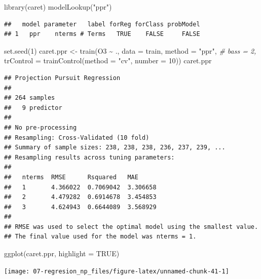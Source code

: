 \documentclass[
  spanish,
]{book}
\newenvironment{Shaded}{\begin{snugshade}}{\end{snugshade}}
\newcommand{\AttributeTok}[1]{\textcolor[rgb]{0.77,0.63,0.00}{#1}}
\newcommand{\CommentTok}[1]{\textcolor[rgb]{0.56,0.35,0.01}{\textit{#1}}}
\newcommand{\ConstantTok}[1]{\textcolor[rgb]{0.00,0.00,0.00}{#1}}
\newcommand{\DecValTok}[1]{\textcolor[rgb]{0.00,0.00,0.81}{#1}}
\newcommand{\FunctionTok}[1]{\textcolor[rgb]{0.00,0.00,0.00}{#1}}
\newcommand{\NormalTok}[1]{#1}
\newcommand{\OtherTok}[1]{\textcolor[rgb]{0.56,0.35,0.01}{#1}}
\newcommand{\SpecialCharTok}[1]{\textcolor[rgb]{0.00,0.00,0.00}{#1}}
\newcommand{\StringTok}[1]{\textcolor[rgb]{0.31,0.60,0.02}{#1}}
\theoremstyle{break}
\theoremstyle{definition}
\theoremstyle{definition}
\theoremstyle{definition}
\theoremstyle{definition}
\theoremstyle{remark}
\begin{document}
\begin{Shaded}
\begin{Highlighting}[]
\FunctionTok{library}\NormalTok{(caret)}
\FunctionTok{modelLookup}\NormalTok{(}\StringTok{"ppr"}\NormalTok{)}
\end{Highlighting}
\end{Shaded}

\begin{verbatim}
##   model parameter   label forReg forClass probModel
## 1   ppr    nterms # Terms   TRUE    FALSE     FALSE
\end{verbatim}

\begin{Shaded}
\begin{Highlighting}[]
\FunctionTok{set.seed}\NormalTok{(}\DecValTok{1}\NormalTok{)}
\NormalTok{caret.ppr }\OtherTok{\textless{}{-}} \FunctionTok{train}\NormalTok{(O3 }\SpecialCharTok{\textasciitilde{}}\NormalTok{ ., }\AttributeTok{data =}\NormalTok{ train, }\AttributeTok{method =} \StringTok{"ppr"}\NormalTok{, }\CommentTok{\# bass = 2,}
    \AttributeTok{trControl =} \FunctionTok{trainControl}\NormalTok{(}\AttributeTok{method =} \StringTok{"cv"}\NormalTok{, }\AttributeTok{number =} \DecValTok{10}\NormalTok{))}
\NormalTok{caret.ppr}
\end{Highlighting}
\end{Shaded}

\begin{verbatim}
## Projection Pursuit Regression 
## 
## 264 samples
##   9 predictor
## 
## No pre-processing
## Resampling: Cross-Validated (10 fold) 
## Summary of sample sizes: 238, 238, 238, 236, 237, 239, ... 
## Resampling results across tuning parameters:
## 
##   nterms  RMSE      Rsquared   MAE     
##   1       4.366022  0.7069042  3.306658
##   2       4.479282  0.6914678  3.454853
##   3       4.624943  0.6644089  3.568929
## 
## RMSE was used to select the optimal model using the smallest value.
## The final value used for the model was nterms = 1.
\end{verbatim}

\begin{Shaded}
\begin{Highlighting}[]
\FunctionTok{ggplot}\NormalTok{(caret.ppr, }\AttributeTok{highlight =} \ConstantTok{TRUE}\NormalTok{)}
\end{Highlighting}
\end{Shaded}

\begin{center}\texttt{[image: 07-regresion\_np\_files/figure-latex/unnamed-chunk-41-1]} \end{center}
\end{document}
